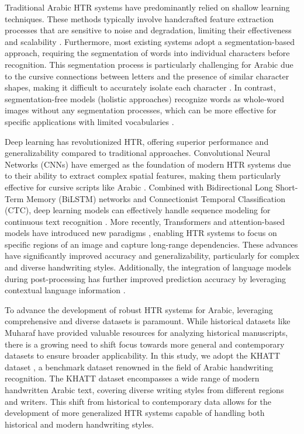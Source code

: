 \documentclass[conference]{IEEEtran}
\begin{document}
Traditional Arabic HTR systems have predominantly relied on shallow learning techniques. These methods typically involve handcrafted feature extraction processes that are sensitive to noise and degradation, limiting their effectiveness and scalability \cite{parvez2013offline}. Furthermore, most existing systems adopt a segmentation-based approach, requiring the segmentation of words into individual characters before recognition. This segmentation process is particularly challenging for Arabic due to the cursive connections between letters and the presence of similar character shapes, making it difficult to accurately isolate each character \cite{source5, source6}. In contrast, segmentation-free models (holistic approaches) recognize words as whole-word images without any segmentation processes, which can be more effective for specific applications with limited vocabularies \cite{source7, source8}.

Deep learning has revolutionized HTR, offering superior performance and generalizability compared to traditional approaches. Convolutional Neural Networks (CNNs) have emerged as the foundation of modern HTR systems due to their ability to extract complex spatial features, making them particularly effective for cursive scripts like Arabic \cite{mosbah2024adocrnet, alrobah2022arabic}. Combined with Bidirectional Long Short-Term Memory (BiLSTM) networks and Connectionist Temporal Classification (CTC), deep learning models can effectively handle sequence modeling for continuous text recognition \cite{li2023trocr}. More recently, Transformers and attention-based models have introduced new paradigms \cite{wang2020decoupled, li2023trocr, bhunia2021metahtr}, enabling HTR systems to focus on specific regions of an image and capture long-range dependencies. These advances have significantly improved accuracy and generalizability, particularly for complex and diverse handwriting styles. Additionally, the integration of language models during post-processing has further improved prediction accuracy by leveraging contextual language information \cite{bhunia2021metahtr}.

To advance the development of robust HTR systems for Arabic, leveraging comprehensive and diverse datasets is paramount. While historical datasets like Muharaf \cite{saeed2024muharaf} have provided valuable resources for analyzing historical manuscripts, there is a growing need to shift focus towards more general and contemporary datasets to ensure broader applicability. In this study, we adopt the KHATT dataset \cite{khatt2020dataset}, a benchmark dataset renowned in the field of Arabic handwriting recognition. The KHATT dataset encompasses a wide range of modern handwritten Arabic text, covering diverse writing styles from different regions and writers. This shift from historical to contemporary data allows for the development of more generalized HTR systems capable of handling both historical and modern handwriting styles.
\end{document}
